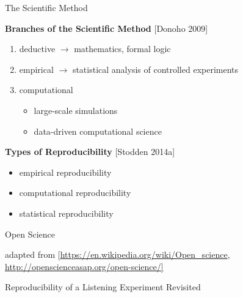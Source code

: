 \documentclass{beamer}
\begin{document}
\begin{frame}{The Scientific Method}

\textbf{Branches of the Scientific Method} {\tiny [Donoho 2009]}
\begin{enumerate}
\item deductive $\rightarrow$ mathematics, formal logic
%
\item empirical $\rightarrow$ statistical analysis of controlled experiments
%
\item computational
\begin{itemize}
\item large-scale simulations
\item data-driven computational science
\end{itemize}
\end{enumerate}

\vfill

\textbf{Types of Reproducibility} {\tiny [Stodden 2014a]}
\begin{itemize}
\item empirical reproducibility
\item computational reproducibility
\item statistical reproducibility
\end{itemize}

\end{frame}


\begin{frame}{Open Science}



\vspace{2mm}
{\tiny adapted from [\url{https://en.wikipedia.org/wiki/Open_science}, \url{http://openscienceasap.org/open-science/]}}

\end{frame}


\begin{frame}{Reproducibility of a Listening Experiment Revisited}


\end{frame}
\end{document}
